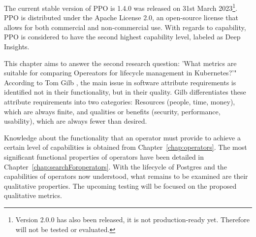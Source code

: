 The current stable version of PPO is 1.4.0 was released on 31st March 2023\footnote[4]{Version 2.0.0 has also been released, it is not production-ready yet. Therefore will not be tested or evaluated.}. \cite{PerconaDocuV2} PPO is distributed under the Apache License 2.0, an open-source license that allows for both commercial and non-commercial use. With regards to capability, PPO is considered to have the second highest capability level, labeled as Deep Insights. \cite{operatorHubPercona}



\label{chap:metrics}
This chapter aims to answer the second research question: 'What metrics are suitable for comparing Opereators for lifecycle management in
Kubernetes?'" According to Tom Gilb \cite{gilb1988principles}, the main issue in software attribute requirements is identified not in their functionality, but in their quality. Gilb differentiates these attribute requirements into two categories: Resources (people, time, money), which are always finite, and qualities or benefits (security, performance, usability), which are always fewer than desired.

Knowledge about the functionality that an operator must provide to achieve a certain level of capabilities is obtained from Chapter~\ref{chap:operators}. The most significant functional properties of operators have been detailed in Chapter~\ref{chap:searchForoperators}. With the lifecycle of Postgres and the capabilities of operators now understood, what remains to be examined are their qualitative properties. The upcoming testing will be focused on the proposed qualitative metrics.

